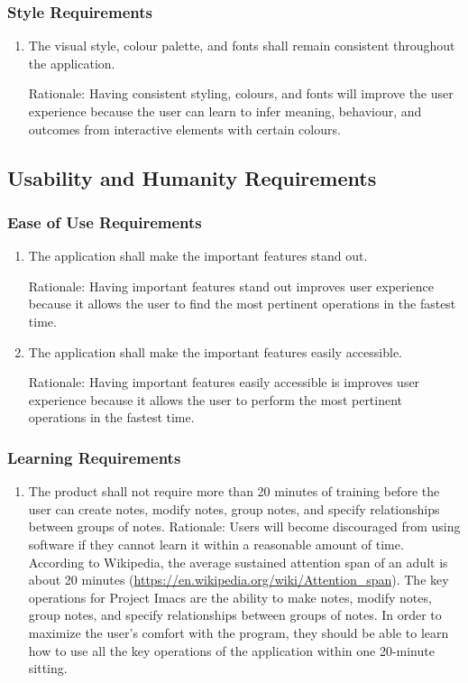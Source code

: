 \documentclass{article}
\begin{document}
\subsubsection{Style Requirements}
\begin{enumerate}[STR1]
\item The visual style, colour palette, and fonts shall remain consistent throughout the application.

Rationale: Having consistent styling, colours, and fonts will improve the user experience because the user can learn to infer meaning, behaviour, and outcomes from interactive elements with certain colours.
\end{enumerate}

\subsection{Usability and Humanity Requirements}
\subsubsection{Ease of Use Requirements}
\begin{enumerate}[EUR1]
\item The application shall make the important features stand out.

Rationale: Having important features stand out improves user experience because it allows the user to find the most pertinent operations in the fastest time.
\item The application shall make the important features easily accessible.

Rationale: Having important features easily accessible is improves user experience because it allows the user to perform the most pertinent operations in the fastest time.
\end{enumerate}

\subsubsection{Learning Requirements}
\begin{enumerate}[LER1]
\item The product shall not require more than 20 minutes of training before the user can create notes, modify notes, group notes, and specify relationships between groups of notes.
Rationale: Users will become discouraged from using software if they cannot learn it within a reasonable amount of time. According to Wikipedia, the average sustained attention span of an adult is about 20 minutes (\url{https://en.wikipedia.org/wiki/Attention_span}). The key operations for Project Imacs are the ability to make notes, modify notes, group notes, and specify relationships between groups of notes. In order to maximize the user's comfort with the program, they should be able to learn how to use all the key operations of the application within one 20-minute sitting.
\end{enumerate}
\end{document}

